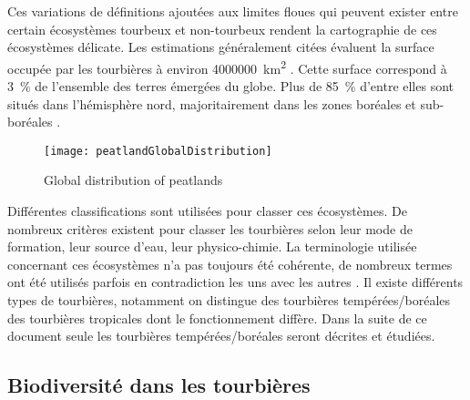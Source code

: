 Ces variations de définitions ajoutées aux limites floues qui peuvent exister entre certain écosystèmes tourbeux et non-tourbeux rendent la cartographie de ces écosystèmes délicate.
Les estimations généralement citées évaluent la surface occupée par les tourbières à environ \SI{4000000}{\square\kilo\meter} \cite{lappalainen1996}. 
Cette surface correspond à \SI{3}{\percent} de l'ensemble des terres émergées du globe.
Plus de \SI{85}{\percent} d'entre elles sont situés dans l'hémisphère nord, majoritairement dans les zones boréales et sub-boréales \cite{society2008}.

\begin{figure}
\centering
\texttt{[image: peatlandGlobalDistribution]}
\caption{Global distribution of peatlands}
\label{fig:peatlandGlobalDistribution} 
\end{figure}

Différentes classifications sont utilisées pour classer ces écosystèmes.
De nombreux critères existent pour classer les tourbières selon leur mode de formation, leur source d'eau, leur physico-chimie.
La terminologie utilisée concernant ces écosystèmes n'a pas toujours été cohérente, de nombreux termes ont été utilisés parfois en contradiction les uns avec les autres \cite{joosten2002}.
Il existe différents types de tourbières, notamment on distingue des tourbières tempérées/boréales des tourbières tropicales dont le fonctionnement diffère.
Dans la suite de ce document seule les tourbières tempérées/boréales seront décrites et étudiées.

\subsection{Biodiversité dans les tourbières}


